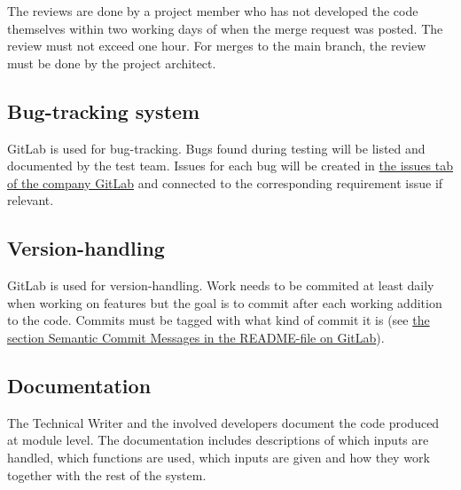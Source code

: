 The reviews are done by a project member who has not developed the code themselves within two working days of when the merge request was posted. The review must not exceed one hour. For merges to the main branch, the review must be done by the project architect.

\subsection{Bug-tracking system}
GitLab is used for bug-tracking. Bugs found during testing will be listed and documented by the test team. Issues for each bug will be created in  \href{https://gitlab.liu.se/tddc88-company-1-2021/deploy/-/issues}{the issues tab of the company GitLab} and connected to the corresponding requirement issue if relevant.

\subsection{Version-handling}
GitLab is used for version-handling. Work needs to be commited at least daily when working on features but the goal is to commit after each working addition to the code. Commits must be tagged with what kind of commit it is (see \href{https://gitlab.liu.se/tddc88-company-1-2021/deploy/-/blob/develop/README.md}{the section Semantic Commit Messages in the README-file on GitLab}).

\subsection{Documentation}
The Technical Writer and the involved developers document the code produced at module level. The documentation includes descriptions of which inputs are handled, which functions are used, which inputs are given and how they work together with the rest of the system.
